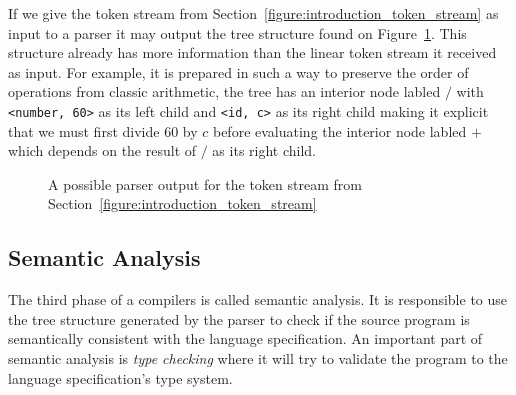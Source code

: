 \documentclass[english, lmodern, oneside, embeddedlogo]{ufsc-thesis-rn46-2019}
\begin{document}
If we give the token stream from Section~\ref{figure:introduction_token_stream} as input to a parser it may output the tree structure found on Figure~\ref{figure:introduction_ast}.
This structure already has more information than the linear token stream it received as input.
For example, it is prepared in such a way to preserve the order of operations from classic arithmetic, the tree has an interior node labled $/$ with \verb+<number, 60>+ as its left child and \verb+<id, c>+ as its right child making it explicit that we must first divide $60$ by $c$ before evaluating the interior node labled $+$ which depends on the result of $/$ as its right child.

\begin{figure}
    \caption{A possible parser output for the token stream from Section~\ref{figure:introduction_token_stream}}\label{figure:introduction_ast}
    \centering
\end{figure}

\subsection{Semantic Analysis}

The third phase of a compilers is called semantic analysis.
It is responsible to use the tree structure generated by the parser to check if the source program is semantically consistent with the language specification.
An important part of semantic analysis is \textit{type checking} where it will try to validate the program to the language specification's type system.
\end{document}
